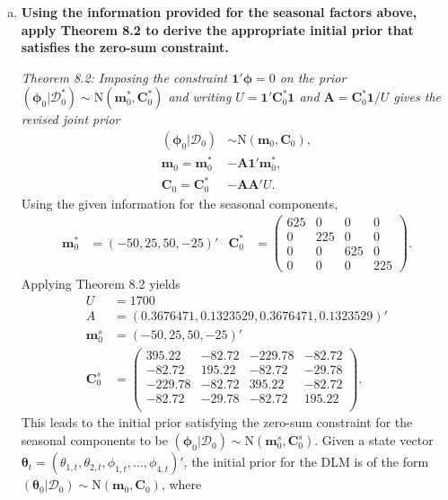 \documentclass{article}
\newcommand{\bone}{\mathbf{1}}
\newcommand{\bphi}{\boldsymbol{\phi}}
\newcommand{\sD}{\mathcal{D}}
\newcommand{\bm}{\mathbf{m}}
\newcommand{\bC}{\mathbf{C}}
\newcommand{\bA}{\mathbf{A}}
\newcommand{\btheta}{\boldsymbol{\theta}}
\begin{document}
	\begin{enumerate}[(a)]
		\item \textbf{Using the information provided for the seasonal factors above, apply Theorem 8.2 to derive the appropriate initial prior that satisfies the zero-sum constraint.}
		
		\textit{Theorem 8.2: Imposing the constraint $\bone'\bphi = 0$ on the prior $(\bphi_0|\sD_0^*) \sim \text{N}(\bm_0^*,\bC_0^*)$ and writing $U = \bone'\bC_0^*\bone$ and $\bA = \bC_0^*\bone/U$ gives the revised joint prior}
		\begin{align*}
			(\bphi_0|\sD_0) & \sim \text{N}(\bm_0,\bC_0),\\
			\bm_0 = \bm_0^* & - \bA\bone'\bm_0^*,\\
			\bC_0 = \bC_0^* & - \bA\bA'U.
		\end{align*} 
		Using the given information for the seasonal components,
		\begin{align*}
			\bm_0^* & = (-50,25,50,-25)' &
			\bC_0^* & = \begin{pmatrix}
				625 & 0 & 0 & 0 \\
				0 & 225 & 0 & 0 \\
				0 & 0 & 625 & 0 \\
				0 & 0 & 0 & 225
			\end{pmatrix}.
		\end{align*}
		Applying Theorem 8.2 yields
		\begin{align*}
			U & = 1700 \\ A & = (0.3676471, 0.1323529, 0.3676471, 0.1323529)' \\
			\bm_0^s & = (-50,  25,  50, -25)' \\
			\bC_0^s & = \begin{pmatrix}
			395.22 & -82.72 & -229.78 & -82.72 \\ 
			-82.72 & 195.22 & -82.72 & -29.78 \\ 
			-229.78 & -82.72 & 395.22 & -82.72 \\ 
			-82.72 & -29.78 & -82.72 & 195.22 \\ 
			\end{pmatrix}.
		\end{align*}
		This leads to the initial prior satisfying the zero-sum constraint for the seasonal components to be $(\bphi_0|\sD_0) \sim \text{N}(\bm_0^s,\bC_0^s)$. Given a state vector $\btheta_t = (\theta_{1,t},\theta_{2,t},\phi_{1,t},\ldots,\phi_{4,t})'$, the initial prior for the DLM is of the form $(\btheta_0|\sD_0) \sim \text{N}(\bm_0,\bC_0)$, where
		\begin{align*}

\end{align*}
\end{enumerate}
\end{document}
